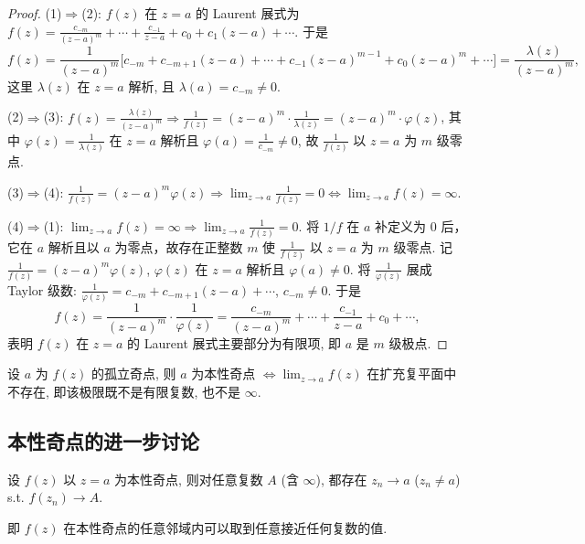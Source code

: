 \documentclass[theorem=false,mathfont=none,openany,sub3section]{easybook}
\begin{document}
\begin{proof}
  (1)$\Rightarrow$(2): $f(z)$ 在 $z=a$ 的 Laurent 展式为 $f(z)=\frac{c_{-m}}{(z-a)^{m}}+\cdots+\frac{c_{-1}}{z-a}+c_{0}+c_{1}(z-a)+\cdots$. 于是
  \[
  f(z)=\frac{1}{(z-a)^{m}}\bigl[c_{-m}+c_{-m+1}(z-a)+\cdots+c_{-1}(z-a)^{m-1}+c_{0}(z-a)^{m}+\cdots\bigr]
  =\frac{\lambda(z)}{(z-a)^{m}},
  \]
  这里 $\lambda(z)$ 在 $z=a$ 解析, 且 $\lambda(a)=c_{-m}\neq0$.

  (2)$\Rightarrow$(3): $f(z)=\frac{\lambda(z)}{(z-a)^{m}}\Rightarrow\frac{1}{f(z)}=(z-a)^{m}\cdot\frac{1}{\lambda(z)}=(z-a)^{m}\cdot\varphi(z)$, 其中 $\varphi(z)=\frac{1}{\lambda(z)}$ 在 $z=a$ 解析且 $\varphi(a)=\frac{1}{c_{-m}}\neq0$, 故 $\frac{1}{f(z)}$ 以 $z=a$ 为 $m$ 级零点.

  (3)$\Rightarrow$(4): $\frac{1}{f(z)}=(z-a)^{m}\varphi(z)\Rightarrow\lim_{z\to a}\frac{1}{f(z)}=0\Leftrightarrow\lim_{z\to a}f(z)=\infty$.

  (4)$\Rightarrow$(1): $\lim_{z\to a}f(z)=\infty\Rightarrow\lim_{z\to a}\frac{1}{f(z)}=0$.
  将 $1/f$ 在 $a$ 补定义为 $0$ 后，它在 $a$ 解析且以 $a$ 为零点，故存在正整数
  $m$ 使 $\frac{1}{f(z)}$ 以 $z=a$ 为 $m$ 级零点. 记
  $\frac{1}{f(z)}=(z-a)^{m}\varphi(z)$, $\varphi(z)$ 在 $z=a$ 解析且
  $\varphi(a)\neq0$. 将 $\frac{1}{\varphi(z)}$ 展成 Taylor 级数:
  $\frac{1}{\varphi(z)}=c_{-m}+c_{-m+1}(z-a)+\cdots$, $c_{-m}\neq0$. 于是
  \[
  f(z)=\frac{1}{(z-a)^{m}}\cdot\frac{1}{\varphi(z)}=\frac{c_{-m}}{(z-a)^{m}}+\cdots+\frac{c_{-1}}{z-a}+c_{0}+\cdots,
  \]
  表明 $f(z)$ 在 $z=a$ 的 Laurent 展式主要部分为有限项, 即 $a$ 是 $m$ 级极点.
\end{proof}

\begin{theorem}[本性奇点的判定]
  设 $a$ 为 $f(z)$ 的孤立奇点, 则 $a$ 为本性奇点
  $\Leftrightarrow\lim_{z\to a}f(z)$ 在扩充复平面中不存在,
  即该极限既不是有限复数, 也不是 $\infty$.
\end{theorem}

\subsection{本性奇点的进一步讨论}

\begin{theorem}
  设 $f(z)$ 以 $z=a$ 为本性奇点, 则对任意复数 $A$ (含 $\infty$), 都存在 $z_{n}\to a$ ($z_{n}\neq a$) s.t. $f(z_{n})\to A$.\par
  即 $f(z)$ 在本性奇点的任意邻域内可以取到任意接近任何复数的值.
\end{theorem}
\end{document}
